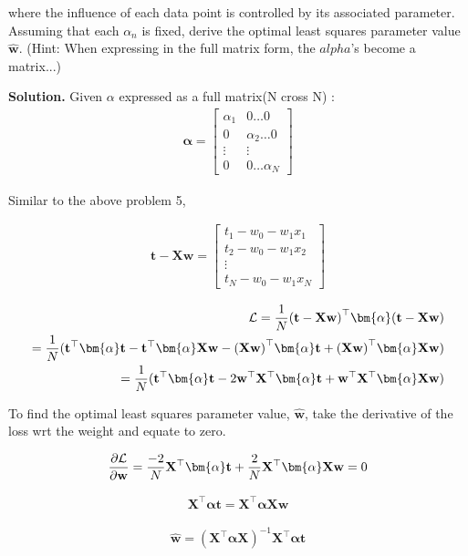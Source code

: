 \documentclass[10pt]{article}
\begin{document}
\begin{itemize}
where the influence of each data point is controlled by its associated parameter.  Assuming that each $\alpha_n$ is fixed, derive the optimal least squares parameter value $\mathbf{\hat{w}}$.  (Hint: When expressing in the full matrix form, the $alpha$'s become a matrix...)

{\bf Solution.} Given $\alpha $ expressed as a full matrix(N cross N) : 
\begin{eqnarray*}
\bm{\alpha} = 
    \begin{bmatrix}
    \alpha_{1} & 0 \hdots 0 \\[0.3em]
    0 & \alpha_{2} \hdots 0 \\[0.3em]
    \vdots  & \vdots\\[0.3em]
    0 & 0 \hdots  \alpha_{N}
    \end{bmatrix}
\end{eqnarray*}

Similar to the above problem 5, 

\begin{eqnarray*}
\mathbf{t} - \mathbf{X}\mathbf{w} = 
	\begin{bmatrix}
    t_1 - w_0 - w_1 x_1 \\[0.3em]
    t_2 - w_0 - w_1 x_2\\[0.3em]
   
    \vdots \\[0.3em]
    t_N - w_0 - w_1 x_{N}
    \end{bmatrix}
\end{eqnarray*}

\begin{eqnarray*}
\mathcal{L} = {1 \over N} {(\mathbf{t} - \mathbf{X}\mathbf{w})}^\top \bm{\alpha}   (\mathbf{t} - \mathbf{X}\mathbf{w}) \\
= {1 \over N} {(\mathbf{t}^\top \bm{\alpha} \mathbf{t} - \mathbf{t}^\top \bm{\alpha} \mathbf{X}\mathbf{w} -  {(\mathbf{X}\mathbf{w})}^\top  \bm{\alpha} \mathbf{t} +     {(\mathbf{X}\mathbf{w})}^\top  \bm{\alpha} \mathbf{X} \mathbf{w} )} \\
=  {1 \over N} {(\mathbf{t}^\top \bm{\alpha} \mathbf{t} - 2 \mathbf{w}^\top \mathbf{X}^\top \bm{\alpha} \mathbf{t} + \mathbf{w}^\top \mathbf{X}^\top  \bm{\alpha} \mathbf{X} \mathbf{w} )}
\end{eqnarray*}

To find the optimal least squares parameter value, $\mathbf{\hat{w}}$, take the derivative of the loss wrt the weight and equate to zero.

\begin{eqnarray*}
{\partial\mathcal{L} \over \partial \mathbf{w}}= {- 2\over N} \mathbf{X}^\top \bm{\alpha} \mathbf{t} + { 2\over N} \mathbf{X}^\top \bm{\alpha} \mathbf{X} \mathbf{w} = 0
\end{eqnarray*}

\begin{eqnarray*}
 \mathbf{X}^\top \bm{\alpha} \mathbf{t} =  \mathbf{X}^\top \bm{\alpha} \mathbf{X} \mathbf{w} 
\end{eqnarray*}

\begin{eqnarray*}
     \mathbf{\hat{w}} = {(\mathbf{X}^\top \bm{\alpha} \mathbf{X})}^{-1}  \mathbf{X}^\top  \bm{\alpha} \mathbf{t}
\end{eqnarray*}

\end{itemize}
\end{document}

